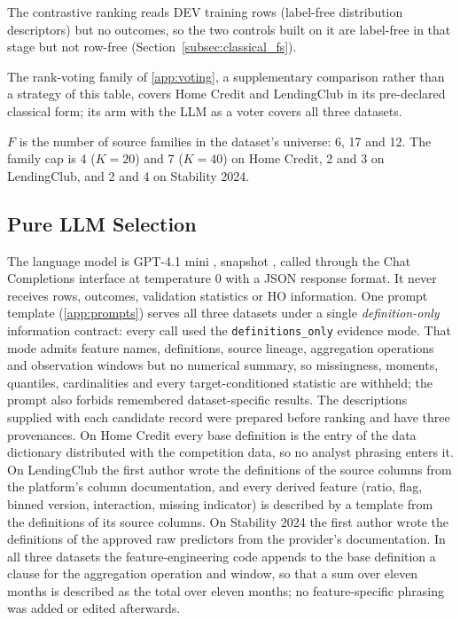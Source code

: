 \documentclass[final,5p,twocolumn]{elsarticle}
\newcommand{\Kfeat}{K}
\begin{document}
\begin{table}[htbp]
\begin{threeparttable}
\begin{tablenotes}
\item[b] The contrastive ranking reads DEV training rows (label-free distribution descriptors) but no outcomes, so the two controls built on it are label-free in that stage but not row-free (Section~\ref{subsec:classical_fs}).
\item The rank-voting family of \ref{app:voting}, a supplementary comparison rather than a strategy of this table, covers Home Credit and LendingClub in its pre-declared classical form; its arm with the LLM as a voter covers all three datasets.
\item $F$ is the number of source families in the dataset's universe: 6, 17 and 12. The family cap is 4 ($\Kfeat=20$) and 7 ($\Kfeat=40$) on Home Credit, 2 and 3 on LendingClub, and 2 and 4 on Stability 2024.
\end{tablenotes}
\end{threeparttable}
\end{table}

\subsection{Pure LLM Selection}
\label{subsec:llm_fs}

The language model is GPT-4.1 mini \cite{openai2025gpt41}, snapshot , called through the Chat Completions interface at temperature 0 with a JSON response format. It never receives rows, outcomes, validation statistics or HO information. One prompt template (\ref{app:prompts}) serves all three datasets under a single \emph{definition-only} information contract: every call used the \texttt{definitions\_only} evidence mode. That mode admits feature names, definitions, source lineage, aggregation operations and observation windows but no numerical summary, so missingness, moments, quantiles, cardinalities and every target-conditioned statistic are withheld; the prompt also forbids remembered dataset-specific results. The descriptions supplied with each candidate record were prepared before ranking and have three provenances. On Home Credit every base definition is the entry of the data dictionary distributed with the competition data, so no analyst phrasing enters it. On LendingClub the first author wrote the definitions of the source columns from the platform's column documentation, and every derived feature (ratio, flag, binned version, interaction, missing indicator) is described by a template from the definitions of its source columns. On Stability 2024 the first author wrote the definitions of the approved raw predictors from the provider's documentation. In all three datasets the feature-engineering code appends to the base definition a clause for the aggregation operation and window, so that a sum over eleven months is described as the total over eleven months; no feature-specific phrasing was added or edited afterwards.
\end{document}
